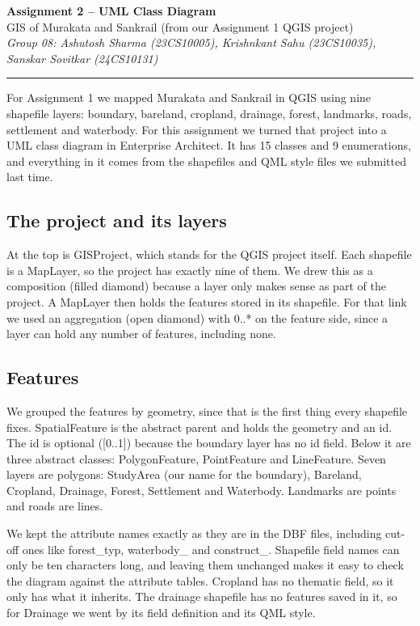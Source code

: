 \documentclass[11pt,a4paper]{article}
\begin{document}
{\Large\bfseries Assignment 2 -- UML Class Diagram}\\[2pt]
GIS of Murakata and Sankrail (from our Assignment 1 QGIS project)\\[2pt]
{\itshape\color{gray} Group 08: Ashutosh Sharma (23CS10005), Krishnkant Sahu (23CS10035), Sanskar Sovitkar (24CS10131)}
\vspace{2pt}\hrule\vspace{8pt}

For Assignment 1 we mapped Murakata and Sankrail in QGIS using nine shapefile layers: boundary, bareland, cropland, drainage, forest, landmarks, roads, settlement and waterbody. For this assignment we turned that project into a UML class diagram in Enterprise Architect. It has 15 classes and 9 enumerations, and everything in it comes from the shapefiles and QML style files we submitted last time.

\subsection*{The project and its layers}
At the top is GISProject, which stands for the QGIS project itself. Each shapefile is a MapLayer, so the project has exactly nine of them. We drew this as a composition (filled diamond) because a layer only makes sense as part of the project. A MapLayer then holds the features stored in its shapefile. For that link we used an aggregation (open diamond) with 0..* on the feature side, since a layer can hold any number of features, including none.

\subsection*{Features}
We grouped the features by geometry, since that is the first thing every shapefile fixes. SpatialFeature is the abstract parent and holds the geometry and an id. The id is optional ([0..1]) because the boundary layer has no id field. Below it are three abstract classes: PolygonFeature, PointFeature and LineFeature. Seven layers are polygons: StudyArea (our name for the boundary), Bareland, Cropland, Drainage, Forest, Settlement and Waterbody. Landmarks are points and roads are lines.

We kept the attribute names exactly as they are in the DBF files, including cut-off ones like forest\_typ, waterbody\_ and construct\_. Shapefile field names can only be ten characters long, and leaving them unchanged makes it easy to check the diagram against the attribute tables. Cropland has no thematic field, so it only has what it inherits. The drainage shapefile has no features saved in it, so for Drainage we went by its field definition and its QML style.
\end{document}
